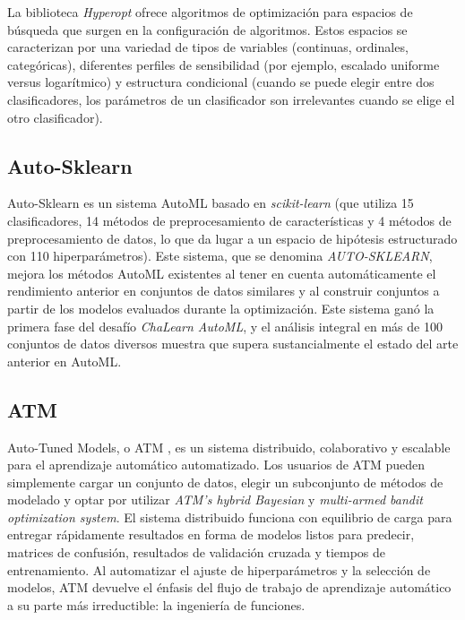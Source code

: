 La biblioteca \textit{Hyperopt} ofrece algoritmos de optimización para espacios de búsqueda que surgen en la configuración de algoritmos. Estos espacios se caracterizan por una variedad de tipos de variables (continuas, ordinales, categóricas), diferentes perfiles de sensibilidad (por ejemplo, escalado uniforme versus logarítmico) y estructura condicional (cuando se puede elegir entre dos clasificadores, los parámetros de un clasificador son irrelevantes cuando se elige el otro clasificador).

\subsection{Auto-Sklearn} 
Auto-Sklearn \parencite{6} es un sistema AutoML basado en \textit{scikit-learn} (que utiliza 15 clasificadores, 14 métodos de preprocesamiento de características y 4 métodos de preprocesamiento de datos, lo que da lugar a un espacio de hipótesis estructurado con 110 hiperparámetros). Este sistema, que se denomina \textit{AUTO-SKLEARN}, mejora los métodos AutoML existentes al tener en cuenta automáticamente el rendimiento anterior en conjuntos de datos similares y al construir conjuntos a partir de los modelos evaluados durante la optimización. Este sistema ganó la primera fase del desafío \textit{ChaLearn AutoML}, y el análisis integral en más de 100 conjuntos de datos diversos muestra que supera sustancialmente el estado del arte anterior en AutoML.

\subsection{ATM}
 Auto-Tuned Models, o ATM \parencite{72}, es un sistema distribuido, colaborativo y escalable para el aprendizaje automático automatizado. Los usuarios de ATM pueden simplemente cargar un conjunto de datos, elegir un subconjunto de métodos de modelado y optar por utilizar \textit{ ATM's hybrid Bayesian} y \textit{ multi-armed bandit optimization system}. El sistema distribuido funciona con equilibrio de carga para entregar rápidamente resultados en forma de modelos listos para predecir, matrices de confusión, resultados de validación cruzada y tiempos de entrenamiento. Al automatizar el ajuste de hiperparámetros y la selección de modelos, ATM devuelve el énfasis del flujo de trabajo de aprendizaje automático a su parte más irreductible: la ingeniería de funciones.

